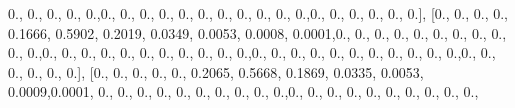 \documentclass[
]{book}
\newenvironment{Shaded}{\begin{snugshade}}{\end{snugshade}}
\newcommand{\FloatTok}[1]{\textcolor[rgb]{0.00,0.00,0.81}{#1}}
\newcommand{\NormalTok}[1]{#1}
\begin{document}
\begin{Shaded}
\begin{Highlighting}[]
\FloatTok{0.}\NormalTok{, }\FloatTok{0.}\NormalTok{, }\FloatTok{0.}\NormalTok{, }\FloatTok{0.}\NormalTok{, }\FloatTok{0.}\NormalTok{,}\FloatTok{0.}\NormalTok{, }\FloatTok{0.}\NormalTok{, }\FloatTok{0.}\NormalTok{, }\FloatTok{0.}\NormalTok{, }\FloatTok{0.}\NormalTok{, }\FloatTok{0.}\NormalTok{, }\FloatTok{0.}\NormalTok{, }\FloatTok{0.}\NormalTok{, }\FloatTok{0.}\NormalTok{, }\FloatTok{0.}\NormalTok{, }\FloatTok{0.}\NormalTok{,}\FloatTok{0.}\NormalTok{, }\FloatTok{0.}\NormalTok{, }\FloatTok{0.}\NormalTok{, }\FloatTok{0.}\NormalTok{,}
\FloatTok{0.}\NormalTok{, }\FloatTok{0.}\NormalTok{], [}\FloatTok{0.}\NormalTok{, }\FloatTok{0.}\NormalTok{, }\FloatTok{0.}\NormalTok{, }\FloatTok{0.}\NormalTok{, }\FloatTok{0.1666}\NormalTok{, }\FloatTok{0.5902}\NormalTok{, }\FloatTok{0.2019}\NormalTok{, }\FloatTok{0.0349}\NormalTok{, }\FloatTok{0.0053}\NormalTok{, }\FloatTok{0.0008}\NormalTok{,}
\FloatTok{0.0001}\NormalTok{,}\FloatTok{0.}\NormalTok{, }\FloatTok{0.}\NormalTok{, }\FloatTok{0.}\NormalTok{, }\FloatTok{0.}\NormalTok{, }\FloatTok{0.}\NormalTok{, }\FloatTok{0.}\NormalTok{, }\FloatTok{0.}\NormalTok{, }\FloatTok{0.}\NormalTok{, }\FloatTok{0.}\NormalTok{, }\FloatTok{0.}\NormalTok{, }\FloatTok{0.}\NormalTok{,}\FloatTok{0.}\NormalTok{, }\FloatTok{0.}\NormalTok{, }\FloatTok{0.}\NormalTok{, }\FloatTok{0.}\NormalTok{, }\FloatTok{0.}\NormalTok{, }\FloatTok{0.}\NormalTok{, }\FloatTok{0.}\NormalTok{,}
\FloatTok{0.}\NormalTok{, }\FloatTok{0.}\NormalTok{, }\FloatTok{0.}\NormalTok{, }\FloatTok{0.}\NormalTok{,}\FloatTok{0.}\NormalTok{, }\FloatTok{0.}\NormalTok{, }\FloatTok{0.}\NormalTok{, }\FloatTok{0.}\NormalTok{, }\FloatTok{0.}\NormalTok{, }\FloatTok{0.}\NormalTok{, }\FloatTok{0.}\NormalTok{, }\FloatTok{0.}\NormalTok{, }\FloatTok{0.}\NormalTok{, }\FloatTok{0.}\NormalTok{, }\FloatTok{0.}\NormalTok{,}\FloatTok{0.}\NormalTok{, }\FloatTok{0.}\NormalTok{, }\FloatTok{0.}\NormalTok{, }\FloatTok{0.}\NormalTok{, }\FloatTok{0.}\NormalTok{,}
\FloatTok{0.}\NormalTok{], [}\FloatTok{0.}\NormalTok{, }\FloatTok{0.}\NormalTok{, }\FloatTok{0.}\NormalTok{, }\FloatTok{0.}\NormalTok{, }\FloatTok{0.}\NormalTok{, }\FloatTok{0.2065}\NormalTok{, }\FloatTok{0.5668}\NormalTok{, }\FloatTok{0.1869}\NormalTok{, }\FloatTok{0.0335}\NormalTok{, }\FloatTok{0.0053}\NormalTok{, }\FloatTok{0.0009}\NormalTok{,}\FloatTok{0.0001}\NormalTok{,}
\FloatTok{0.}\NormalTok{, }\FloatTok{0.}\NormalTok{, }\FloatTok{0.}\NormalTok{, }\FloatTok{0.}\NormalTok{, }\FloatTok{0.}\NormalTok{, }\FloatTok{0.}\NormalTok{, }\FloatTok{0.}\NormalTok{, }\FloatTok{0.}\NormalTok{, }\FloatTok{0.}\NormalTok{, }\FloatTok{0.}\NormalTok{,}\FloatTok{0.}\NormalTok{, }\FloatTok{0.}\NormalTok{, }\FloatTok{0.}\NormalTok{, }\FloatTok{0.}\NormalTok{, }\FloatTok{0.}\NormalTok{, }\FloatTok{0.}\NormalTok{, }\FloatTok{0.}\NormalTok{, }\FloatTok{0.}\NormalTok{, }\FloatTok{0.}\NormalTok{, }\FloatTok{0.}\NormalTok{,}

\end{Highlighting}
\end{Shaded}
\end{document}
